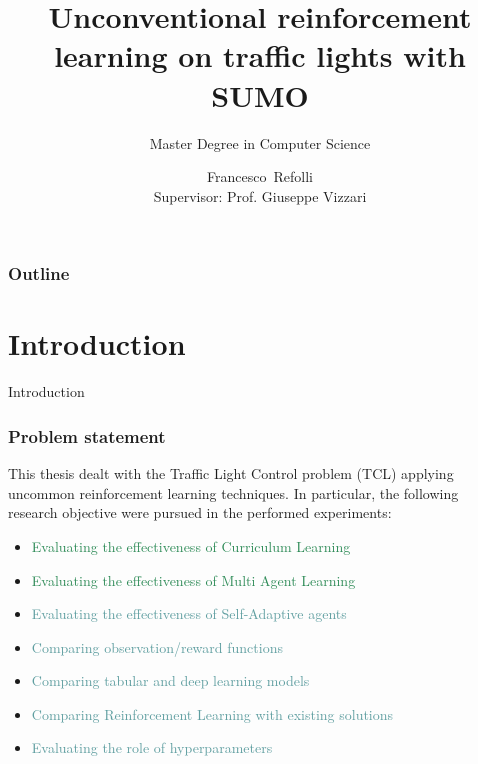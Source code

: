 \documentclass[dvipsnames]{beamer}
\date[26 September 2025]{}
\title[SUMO, Curriculums and MARL]{Unconventional reinforcement learning on traffic lights with SUMO}
\subtitle{Master Degree in Computer Science}
\author[R.F. 865955]{Francesco~Refolli\\[10mm]{\small Supervisor: Prof. Giuseppe Vizzari}}
\begin{document}
\frame{\titlepage}


\begin{frame}
\frametitle{Outline}
\tableofcontents
\end{frame}

\section{Introduction}
\begin{frame}
\centering
\Huge
Introduction
\end{frame}

\begin{frame}
  \frametitle{Problem statement}

  This thesis dealt with the Traffic Light Control problem (TCL) applying uncommon reinforcement learning techniques.
  In particular, the following research objective were pursued in the performed experiments:

  \begin{itemize}
    \item \textcolor{SeaGreen}{Evaluating the effectiveness of Curriculum Learning}
    \item \textcolor{SeaGreen}{Evaluating the effectiveness of Multi Agent Learning}
    \item \textcolor{CadetBlue}{Evaluating the effectiveness of Self-Adaptive agents}
    \item \textcolor{CadetBlue}{Comparing observation/reward functions}
    \item \textcolor{CadetBlue}{Comparing tabular and deep learning models}
    \item \textcolor{CadetBlue}{Comparing Reinforcement Learning with existing solutions}
    \item \textcolor{CadetBlue}{Evaluating the role of hyperparameters}
  \end{itemize}
\end{frame}
\end{document}
